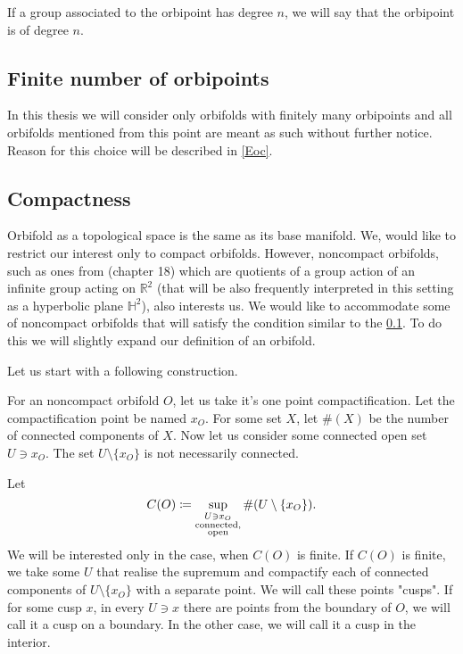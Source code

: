 If a group associated to the orbipoint has degree $n$, we will say that the orbipoint is 
of degree $n$. 
\subsection{Finite number of orbipoints}\label{finite number of orbipoints}
In this thesis we will consider only orbifolds with finitely many orbipoints and all orbifolds 
mentioned from this point are meant as such without further notice. Reason for this 
choice will be described in \ref{Eoc}.  

\subsection{Compactness}\label{compactness}
Orbifold as a topological space is the same as its base manifold.
We, would like to restrict our interest only to compact orbifolds. 
However, noncompact orbifolds, such as ones from \cite{Conway2016} (chapter 18) 
which are quotients 
of a group action of an infinite group acting on $\mathbb{R}^2$ (that will 
be also frequently interpreted in this setting as a hyperbolic plane $\mathbb{H}^2$), 
also interests us. We would like to accommodate some of noncompact orbifolds that 
will satisfy the condition similar to the \ref{finite number of orbipoints}. 
To do this we will slightly expand our definition of an orbifold. 

Let us start with a following construction.

For an noncompact orbifold $O$, let us take it's one point compactification. 
Let the compactification point be named $x_O$.  
For some set $X$, let $\#(X)$ be the number of connected components of $X$.
Now let us consider some connected open set $U \ni x_O$. The set $U\setminus\{x_O\}$ is 
not necessarily connected.
 
Let 
\begin{equation}
C(O) \coloneqq \sup\limits_{\substack{U \ni x_O \\ \rm connected, \\ \rm open }} 
\#(U\setminus\{x_O\}).
\end{equation}
We will be interested only in the case, when $C(O)$ is finite.
If $C(O)$ is finite, we take some $U$ that realise the supremum and compactify each of 
connected components of $U\setminus\{x_O\}$ with a separate point. We will call these points 
"cusps". If for some cusp $x$, in every $U \ni x$ there are points from the boundary of $O$, 
we will call it a cusp on a boundary. In the other case, we will call it a cusp in the interior.


